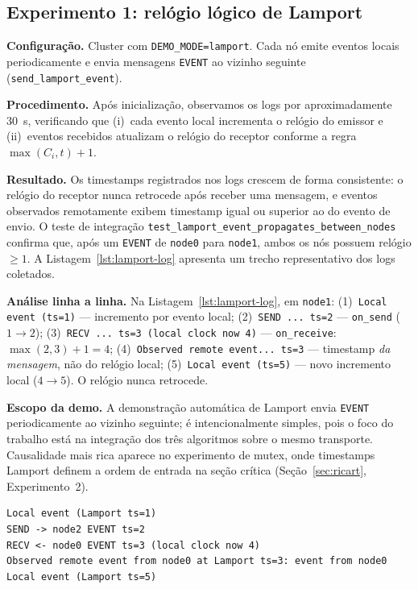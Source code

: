 \documentclass[10pt, a4paper, titlepage]{extarticle}
\begin{document}
\subsection{Experimento 1: relógio lógico de Lamport}
\textbf{Configuração.} Cluster com \texttt{DEMO\_MODE=lamport}. Cada nó emite eventos locais periodicamente e envia mensagens \texttt{EVENT} ao vizinho seguinte (\texttt{send\_lamport\_event}).

\textbf{Procedimento.} Após inicialização, observamos os logs por aproximadamente 30~s, verificando que (i)~cada evento local incrementa o relógio do emissor e (ii)~eventos recebidos atualizam o relógio do receptor conforme a regra $\max(C_i, t) + 1$.

\textbf{Resultado.} Os timestamps registrados nos logs crescem de forma consistente: o relógio do receptor nunca retrocede após receber uma mensagem, e eventos observados remotamente exibem timestamp igual ou superior ao do evento de envio. O teste de integração \texttt{test\_lamport\_event\_propagates\_between\_nodes} confirma que, após um \texttt{EVENT} de \texttt{node0} para \texttt{node1}, ambos os nós possuem relógio $\geq 1$. A Listagem~\ref{lst:lamport-log} apresenta um trecho representativo dos logs coletados.

\textbf{Análise linha a linha.} Na Listagem~\ref{lst:lamport-log}, em \texttt{node1}: (1)~\texttt{Local event (ts=1)} --- incremento por evento local; (2)~\texttt{SEND ... ts=2} --- \texttt{on\_send} ($1 \rightarrow 2$); (3)~\texttt{RECV ... ts=3 (local clock now 4)} --- \texttt{on\_receive}: $\max(2, 3)+1 = 4$; (4)~\texttt{Observed remote event... ts=3} --- timestamp \emph{da mensagem}, não do relógio local; (5)~\texttt{Local event (ts=5)} --- novo incremento local ($4 \rightarrow 5$). O relógio nunca retrocede.

\textbf{Escopo da demo.} A demonstração automática de Lamport envia \texttt{EVENT} periodicamente ao vizinho seguinte; é intencionalmente simples, pois o foco do trabalho está na integração dos três algoritmos sobre o mesmo transporte. Causalidade mais rica aparece no experimento de mutex, onde timestamps Lamport definem a ordem de entrada na seção crítica (Seção~\ref{sec:ricart}, Experimento~2).

\begin{lstlisting}[caption={Trecho de log do experimento Lamport (\texttt{docker compose logs node1}).},label=lst:lamport-log]
Local event (Lamport ts=1)
SEND -> node2 EVENT ts=2
RECV <- node0 EVENT ts=3 (local clock now 4)
Observed remote event from node0 at Lamport ts=3: event from node0
Local event (Lamport ts=5)
\end{lstlisting}
\end{document}
